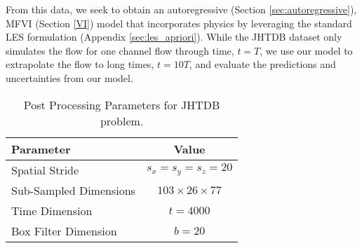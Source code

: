 From this data, we seek to obtain an autoregressive (Section \ref{sec:autoregressive}), MFVI (Section \ref{VI}) model that incorporates physics by leveraging the standard LES formulation (Appendix \ref{sec:les_apriori}). While the JHTDB dataset only simulates the flow for one channel flow through time, $t=T$, we use our model to extrapolate the flow to long times, $t=10T$, and evaluate the predictions and uncertainties from our model.



\begin{table}[H]
    \centering
    \begin{tabular}{|l|c|} \hline 
        
        \textbf{Parameter} & \textbf{Value} \\ \hline 
        
        Spatial Stride & \( s_{x} = s_{y} = s_{z} = 20 \) \\ \hline 
        
        Sub-Sampled Dimensions & \( 103 \times 26 \times 77 \) \\ \hline 
        
        Time Dimension & \( t = 4000 \) \\ \hline 
        
        Box Filter Dimension & \( b = 20 \) \\ \hline
        
    \end{tabular}
    \caption{Post Processing Parameters for JHTDB problem.}
    \label{tab:post_processing_parameters}
\end{table}

